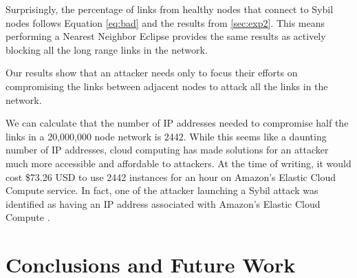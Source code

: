 \documentclass[11pt,conference]{IEEEtran}
\begin{document}
Surprisingly, the percentage of links from healthy nodes that connect to Sybil nodes follows Equation \ref{eq:bad} and the results from \ref{sec:exp2}.
This means performing a Nearest Neighbor Eclipse provides the same results as actively blocking all the long range links in the network.

Our results show that an attacker needs only to focus their efforts on compromising the links between adjacent nodes to attack all the links in the network.

We can calculate that the number of IP addresses needed to compromise half the links in a 20,000,000 node network is 2442.
While this seems like a daunting number of IP addresses, cloud computing has made solutions for an attacker much more accessible and affordable to attackers.
At the time of writing, it would cost \$73.26 USD to use 2442 instances for an hour on Amazon's Elastic Cloud Compute service.
In fact, one of the attacker launching a Sybil attack was identified as having an IP address associated with Amazon's Elastic Cloud Compute \cite{sybilbit}.








\section{Conclusions and Future Work}
\label{sec:horror}
\end{document}

